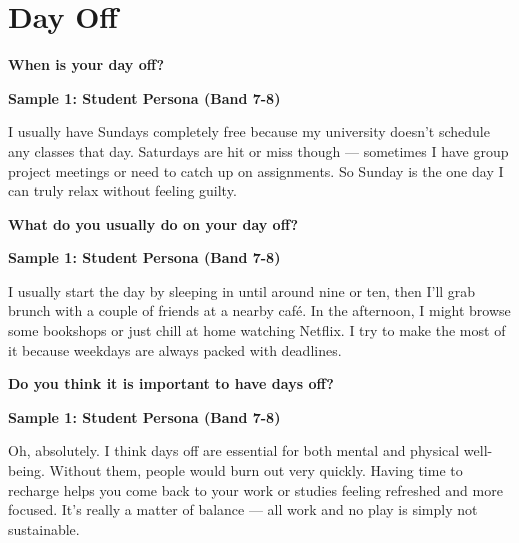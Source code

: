 \newpage

\section{Day Off}
\begin{ieltsquestion}
\textbf{When is your day off?}
\end{ieltsquestion}
\textbf{Sample 1: Student Persona (Band 7-8)}

I usually have Sundays completely free because my university doesn't schedule any classes that day. Saturdays are hit or miss though — sometimes I have group project meetings or need to catch up on assignments. So Sunday is the one day I can truly relax without feeling guilty.

\separator

\begin{ieltsquestion}
\textbf{What do you usually do on your day off?}
\end{ieltsquestion}
\textbf{Sample 1: Student Persona (Band 7-8)}

I usually start the day by sleeping in until around nine or ten, then I'll grab brunch with a couple of friends at a nearby café. In the afternoon, I might browse some bookshops or just chill at home watching Netflix. I try to make the most of it because weekdays are always packed with deadlines.

\separator

\begin{ieltsquestion}
\textbf{Do you think it is important to have days off?}
\end{ieltsquestion}
\textbf{Sample 1: Student Persona (Band 7-8)}

Oh, absolutely. I think days off are essential for both mental and physical well-being. Without them, people would burn out very quickly. Having time to recharge helps you come back to your work or studies feeling refreshed and more focused. It's really a matter of balance — all work and no play is simply not sustainable.

\separator


